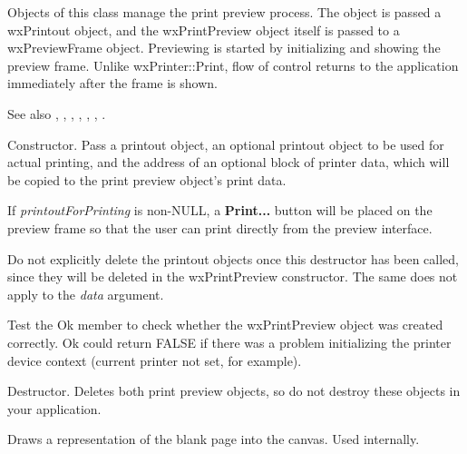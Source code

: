 
Objects of this class manage the print preview process. The object is passed
a wxPrintout object, and the wxPrintPreview object itself is passed to
a wxPreviewFrame object. Previewing is started by initializing and showing
the preview frame. Unlike wxPrinter::Print, flow of control returns to the application
immediately after the frame is shown.

See also , ,\rtfsp
{}, ,\rtfsp
{}, ,\rtfsp
{}.



Constructor. Pass a printout object, an optional printout object to be
used for actual printing, and the address of an optional
block of printer data, which will be copied to the print preview object's
print data.

If {\it printoutForPrinting} is non-NULL, a {\bf Print...} button will be placed on the
preview frame so that the user can print directly from the preview interface.

Do not explicitly delete the printout objects once this destructor has been
called, since they will be deleted in the wxPrintPreview constructor.
The same does not apply to the {\it data} argument.

Test the Ok member to check whether the wxPrintPreview object was created correctly.
Ok could return FALSE if there was a problem initializing the printer device context
(current printer not set, for example).



Destructor. Deletes both print preview objects, so do not destroy these objects
in your application.



Draws a representation of the blank page into the canvas. Used
internally.

